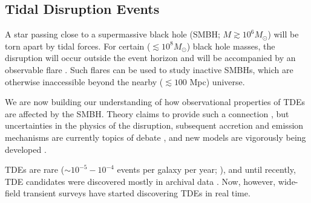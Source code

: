 %
%
%
%

\subsection{Tidal Disruption Events}
\def\secname{\chpname:tdes}\label{sec:\secname}


A star passing close to a supermassive black hole (SMBH;
$M\gtrsim10^{6}M_{\odot}$) will be torn apart by tidal forces. For
certain ($\lesssim10^{8}M_{\odot}$) black hole masses, the disruption
will occur outside the event horizon and will be accompanied by an
observable flare \citep{Hills1975, Rees1988}. Such flares can be used to
study inactive SMBHs, which are otherwise inaccessible beyond the nearby
($\lesssim100$ Mpc) universe.

We are now building our understanding of how observational properties of
TDEs are affected by the SMBH. Theory claims to provide such a
connection \citep[e.g.][]{Lodato2009, Guillochon2014}, but uncertainties
in the physics of the disruption, subsequent accretion and emission
mechanisms are currently topics of debate \citep[e.g.][]{Strubbe2015,
Guillochon2014, Roth2015}, and new models are vigorously being developed
\citep[e.g.][]{Piran2015, Hayasaki2015, Svirski2015, Bonnerot2015}.

TDEs are rare ($\sim10^{-5}-10^{-4}$ events per galaxy per year;
\citealp{Wang2004, Stone2015}), and until recently, TDE candidates were
discovered mostly in archival data \citep[e.g.][]{Donley2002,
Gezari2006, Esquej2007}. Now, however, wide-field transient surveys have
started discovering TDEs in real time.

